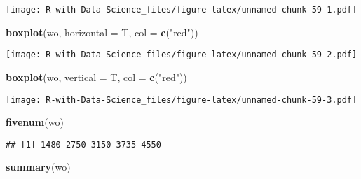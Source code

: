 \documentclass[
]{article}
\newenvironment{Shaded}{\begin{snugshade}}{\end{snugshade}}
\newcommand{\AttributeTok}[1]{\textcolor[rgb]{0.13,0.29,0.53}{#1}}
\newcommand{\DecValTok}[1]{\textcolor[rgb]{0.00,0.00,0.81}{#1}}
\newcommand{\FunctionTok}[1]{\textcolor[rgb]{0.13,0.29,0.53}{\textbf{#1}}}
\newcommand{\NormalTok}[1]{#1}
\newcommand{\SpecialCharTok}[1]{\textcolor[rgb]{0.81,0.36,0.00}{\textbf{#1}}}
\newcommand{\StringTok}[1]{\textcolor[rgb]{0.31,0.60,0.02}{#1}}
\begin{document}
\begin{Shaded}
\end{Shaded}

\texttt{[image: R-with-Data-Science\_files/figure-latex/unnamed-chunk-59-1.pdf]}

\begin{Shaded}
\begin{Highlighting}[]
\FunctionTok{boxplot}\NormalTok{(wo, }\AttributeTok{horizontal =}\NormalTok{ T, }\AttributeTok{col =} \FunctionTok{c}\NormalTok{(}\StringTok{"red"}\NormalTok{))}
\end{Highlighting}
\end{Shaded}

\texttt{[image: R-with-Data-Science\_files/figure-latex/unnamed-chunk-59-2.pdf]}

\begin{Shaded}
\begin{Highlighting}[]
\FunctionTok{boxplot}\NormalTok{(wo, }\AttributeTok{vertical =}\NormalTok{ T, }\AttributeTok{col =} \FunctionTok{c}\NormalTok{(}\StringTok{"red"}\NormalTok{))}
\end{Highlighting}
\end{Shaded}

\texttt{[image: R-with-Data-Science\_files/figure-latex/unnamed-chunk-59-3.pdf]}

\begin{Shaded}
\begin{Highlighting}[]
\FunctionTok{fivenum}\NormalTok{(wo)}
\end{Highlighting}
\end{Shaded}

\begin{verbatim}
## [1] 1480 2750 3150 3735 4550
\end{verbatim}

\begin{Shaded}
\begin{Highlighting}[]
\FunctionTok{summary}\NormalTok{(wo)}
\end{Highlighting}
\end{Shaded}
\end{document}
